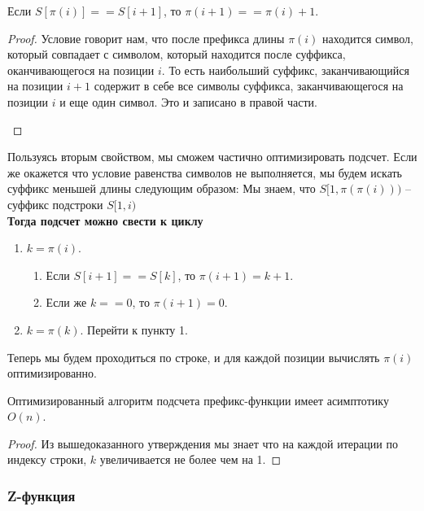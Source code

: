 \begin{prop}
	Если $S[\pi(i)] == S[i + 1]$, то  $\pi(i + 1) == \pi(i) + 1$.
\end{prop}
\begin{proof}
	Условие говорит нам, что после префикса длины $\pi(i)$ находится символ, который совпадает с символом, который находится после суффикса, оканчивающегося на позиции $i$. То есть наибольший суффикс, заканчивающийся на позиции $i + 1$ содержит в себе все символы суффикса, заканчивающегося на позиции $i$ и еще один символ. Это и записано в правой части.
	\begin{center}
	\end{center}
\end{proof}

Пользуясь вторым свойством, мы сможем частично оптимизировать подсчет. Если же окажется что условие равенства символов не выполняется, мы будем искать суффикс меньшей длины следующим образом:
Мы знаем, что $S[1, \pi(\pi(i)))$ -- суффикс подстроки  $S[1, i)$ \\

\textbf{Тогда подсчет можно свести к циклу}
\begin{enumerate}
\setcounter{enumi}{0}
	\item $k = \pi(i)$.
	\begin{enumerate}
		\item Если $S[i + 1] == S[k]$, то $\pi(i + 1) = k + 1$.
		\item Если же $k == 0$, то $\pi(i + 1) = 0$.
	\end{enumerate}
	\item $k = \pi(k)$. Перейти к пункту 1.
\end{enumerate}

Теперь мы будем проходиться по строке, и для каждой позиции вычислять $\pi(i)$ оптимизированно.

\begin{prop}
	Оптимизированный алгоритм подсчета префикс-функции имеет асимптотику $O(n)$.	
\end{prop}
\begin{proof}
	Из вышедоказанного утверждения мы знает что на каждой итерации по индексу строки, $k$ увеличивается не более чем на 1.
\end{proof}

\subsubsection{Z-функция}

